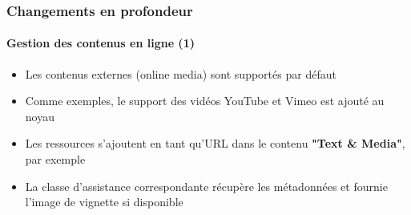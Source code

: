 \begin{frame}[fragile]
	\frametitle{Changements en profondeur}
	\framesubtitle{Gestion des contenus en ligne (1)}

	\begin{itemize}

		\item Les contenus externes (online media) sont supportés par défaut

		\item Comme exemples, le support des vidéos YouTube et Vimeo est ajouté au noyau

		\item Les ressources s'ajoutent en tant qu'URL dans le contenu \textbf{"Text \& Media"},
			par exemple

		\item La classe d'assistance correspondante récupère les métadonnées et fournie
			l'image de vignette si disponible

	\end{itemize}

\end{frame}


